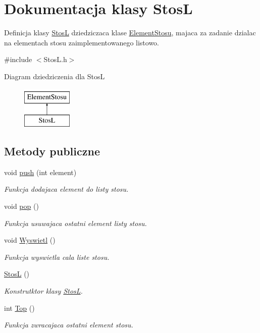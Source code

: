 \hypertarget{class_stos_l}{\section{Dokumentacja klasy Stos\-L}
\label{class_stos_l}
}


Definicja klasy \hyperlink{class_stos_l}{Stos\-L} dziedziczaca klase \hyperlink{class_element_stosu}{Element\-Stosu}, majaca za zadanie dzialac na elementach stosu zaimplementowanego listowo.  




{\ttfamily \#include $<$Stos\-L.\-h$>$}

Diagram dziedziczenia dla Stos\-L\begin{figure}[H]
\begin{center}
\leavevmode
\includegraphics[height=2.000000cm]{class_stos_l}
\end{center}
\end{figure}
\subsection*{Metody publiczne}
\begin{DoxyCompactItemize}
\item 
void \hyperlink{class_stos_l_a429618cfa90a27679752faa885327218}{push} (int element)
\begin{DoxyCompactList}\small\item\em Funkcja dodajaca element do listy stosu. \end{DoxyCompactList}\item 
void \hyperlink{class_stos_l_aac10552d2133224615463be4a0e900c6}{pop} ()
\begin{DoxyCompactList}\small\item\em Funkcja usuwajaca ostatni element listy stosu. \end{DoxyCompactList}\item 
void \hyperlink{class_stos_l_a72dc2c599ac50911cd195d504ec397d6}{Wyswietl} ()
\begin{DoxyCompactList}\small\item\em Funkcja wyswietla cala liste stosu. \end{DoxyCompactList}\item 
\hyperlink{class_stos_l_adcf4ea69c11f7c501bbc85fa7cb1eabd}{Stos\-L} ()
\begin{DoxyCompactList}\small\item\em Konstrutktor klasy \hyperlink{class_stos_l}{Stos\-L}. \end{DoxyCompactList}\item 
int \hyperlink{class_stos_l_ad2bc9646e6994253c7804f83956fbc0f}{Top} ()
\begin{DoxyCompactList}\small\item\em Funkcja zwracajaca ostatni element stosu. \end{DoxyCompactList}\end{DoxyCompactItemize}
